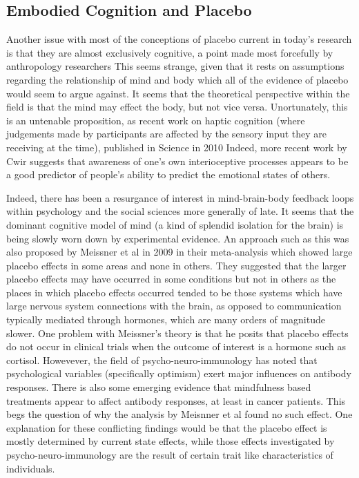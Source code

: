 \subsection{Embodied Cognition and Placebo}

Another issue with most of the conceptions of placebo current in today's research is that they are almost exclusively cognitive, a point made most forcefully by anthropology researchers \cite{} %
This seems strange, given that it rests on assumptions regarding the relationship of mind and body which all of the evidence of placebo would seem to argue against. It seems that the theoretical perspective within the field is that the mind may effect the body, but not vice versa. Unortunately, this is an untenable proposition, as recent work on haptic cognition (where judgements made by participants are affected by the sensory input they are receiving at the time), published in Science in 2010 %
Indeed, more recent work by Cwir \cite{Cwir2011} suggests that awareness of one's own interioceptive processes appears to be a good predictor of people's ability to predict the emotional states of others. 



Indeed, there has been a resurgance of interest in mind-brain-body feedback loops within psychology and the social sciences more generally of late. It seems that the dominant cognitive model of mind (a kind of splendid isolation for the brain) is being slowly worn down by experimental evidence. An approach such as this was also proposed by Meissner et al in 2009 \cite{Meissner2009} in their meta-analysis which showed large placebo effects in some areas and none in others. They suggested that the larger placebo effects may have occurred in some conditions but not in others as the places in which placebo effects occurred tended to be those systems which have large nervous system connections with the brain, as opposed to communication typically mediated through hormones, which are many orders of magnitude slower. One problem with Meissner's theory is that he posits that placebo effects do not occur in clinical trials when the outcome of interest is a hormone such as cortisol. Howevever, the field of psycho-neuro-immunology has noted that psychological variables (specifically optimism) exert major influences on antibody responses. There is also some emerging evidence that mindfulness based treatments appear to affect antibody responses, at least in cancer patients. This begs the question of why the analysis by Meisnner et al found no such effect. One explanation for these conflicting findings would be that the placebo effect is mostly determined by current state effects, while those effects investigated by psycho-neuro-immunology are the result of certain trait like characteristics of individuals.  

